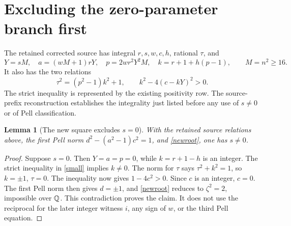\documentclass[11pt]{article}
\newtheorem{lemma}[theorem]{Lemma}
\begin{document}
\section{Excluding the zero-parameter branch first}

The retained corrected source has integral \(r,s,w,c,h\), rational
\(\tau\), and
\[
 Y=sM,\quad a=(wM+1)rY,\quad p=2wr^2Y^2M,\quad
 k=r+1+h(p-1),\qquad M=n^2\ge16.
\]
It also has the two relations
\begin{equation}\label{small}
 \tau^2=(p^2-1)k^2+1,
 \qquad k^2-4(c-kY)^2>0.
\end{equation}
The strict inequality is represented by the existing positivity row.
The source-prefix reconstruction establishes the integrality just
listed before any use of \(s\ne0\) or of Pell classification.

\begin{lemma}[The new square excludes \(s=0\)]\label{nonzero}
With the retained source relations above, the first Pell norm
\(d^2-(a^2-1)c^2=1\), and \eqref{newroot}, one has \(s\ne0\).
\end{lemma}
\begin{proof}
Suppose \(s=0\). Then \(Y=a=p=0\), while
\(k=r+1-h\) is an integer. The strict inequality in \eqref{small}
implies \(k\ne0\). The norm for \(\tau\) says
\(\tau^2+k^2=1\), so \(k=\pm1\), \(\tau=0\).
The inequality now gives \(1-4c^2>0\). Since \(c\) is an
integer, \(c=0\). The first Pell norm then gives \(d=\pm1\),
and \eqref{newroot} reduces to \(\zeta^2=2\), impossible over
\(\mathbb Q\). This contradiction proves the claim. It does not use the
reciprocal for the later integer witness \(i\), any sign of \(w\),
or the third Pell equation.
\end{proof}
\end{document}
